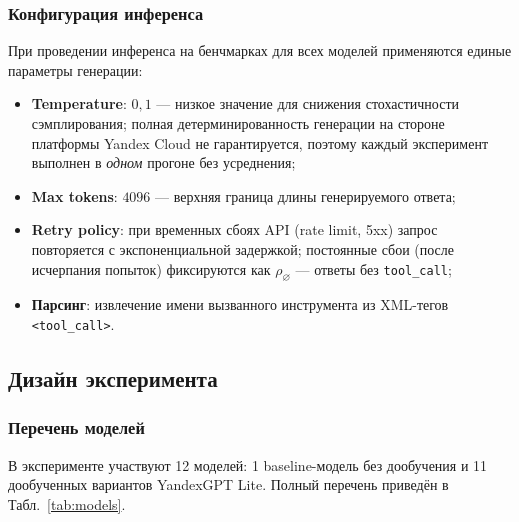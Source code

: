 \subsubsection{Конфигурация инференса}

При проведении инференса на бенчмарках для всех моделей применяются единые параметры генерации:
\begin{itemize}
    \item \textbf{Temperature}: $0{,}1$ --- низкое значение для снижения стохастичности сэмплирования; полная детерминированность генерации на стороне платформы Yandex Cloud не гарантируется, поэтому каждый эксперимент выполнен в \emph{одном} прогоне без усреднения;
    \item \textbf{Max tokens}: $4096$ --- верхняя граница длины генерируемого ответа;
    \item \textbf{Retry policy}: при временных сбоях API (rate limit, 5xx) запрос повторяется с экспоненциальной задержкой; постоянные сбои (после исчерпания попыток) фиксируются как $\rho_\varnothing$ --- ответы без \texttt{tool\_call};
    \item \textbf{Парсинг}: извлечение имени вызванного инструмента из XML-тегов \texttt{<tool\_call>}.
\end{itemize}

\subsection{Дизайн эксперимента} \label{subsec:design}

\subsubsection{Перечень моделей}

В эксперименте участвуют 12 моделей: 1 baseline-модель без дообучения и 11 дообученных вариантов YandexGPT Lite. Полный перечень приведён в Табл.~\ref{tab:models}.

